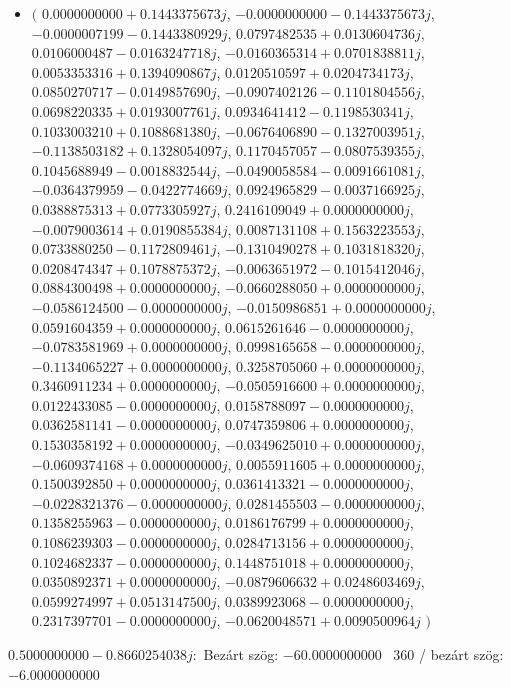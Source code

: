 \documentclass[14pt,a4paper]{article}
\begin{document}
\begin{itemize}
\item
$\big($
$0.0000000000+0.1443375673j$, $-0.0000000000-0.1443375673j$, $-0.0000007199-0.1443380929j$, $0.0797482535+0.0130604736j$, $0.0106000487-0.0163247718j$, $-0.0160365314+0.0701838811j$, $0.0053353316+0.1394090867j$, $0.0120510597+0.0204734173j$, $0.0850270717-0.0149857690j$, $-0.0907402126-0.1101804556j$, $0.0698220335+0.0193007761j$, $0.0934641412-0.1198530341j$, $0.1033003210+0.1088681380j$, $-0.0676406890-0.1327003951j$, $-0.1138503182+0.1328054097j$, $0.1170457057-0.0807539355j$, $0.1045688949-0.0018832544j$, $-0.0490058584-0.0091661081j$, $-0.0364379959-0.0422774669j$, $0.0924965829-0.0037166925j$, $0.0388875313+0.0773305927j$, $0.2416109049+0.0000000000j$, $-0.0079003614+0.0190855384j$, $0.0087131108+0.1563223553j$, $0.0733880250-0.1172809461j$, $-0.1310490278+0.1031818320j$, $0.0208474347+0.1078875372j$, $-0.0063651972-0.1015412046j$, $0.0884300498+0.0000000000j$, $-0.0660288050+0.0000000000j$, $-0.0586124500-0.0000000000j$, $-0.0150986851+0.0000000000j$, $0.0591604359+0.0000000000j$, $0.0615261646-0.0000000000j$, $-0.0783581969+0.0000000000j$, $0.0998165658-0.0000000000j$, $-0.1134065227+0.0000000000j$, $0.3258705060+0.0000000000j$, $0.3460911234+0.0000000000j$, $-0.0505916600+0.0000000000j$, $0.0122433085-0.0000000000j$, $0.0158788097-0.0000000000j$, $0.0362581141-0.0000000000j$, $0.0747359806+0.0000000000j$, $0.1530358192+0.0000000000j$, $-0.0349625010+0.0000000000j$, $-0.0609374168+0.0000000000j$, $0.0055911605+0.0000000000j$, $0.1500392850+0.0000000000j$, $0.0361413321-0.0000000000j$, $-0.0228321376-0.0000000000j$, $0.0281455503-0.0000000000j$, $0.1358255963-0.0000000000j$, $0.0186176799+0.0000000000j$, $0.1086239303-0.0000000000j$, $0.0284713156+0.0000000000j$, $0.1024682337-0.0000000000j$, $0.1448751018+0.0000000000j$, $0.0350892371+0.0000000000j$, $-0.0879606632+0.0248603469j$, $0.0599274997+0.0513147500j$, $0.0389923068-0.0000000000j$, $0.2317397701-0.0000000000j$, $-0.0620048571+0.0090500964j$
$\big)$
\end{itemize}
$0.5000000000-0.8660254038j$:\
Bezárt szög: $-60.0000000000$ \
360 / bezárt szög: $-6.0000000000$\
\end{document}
